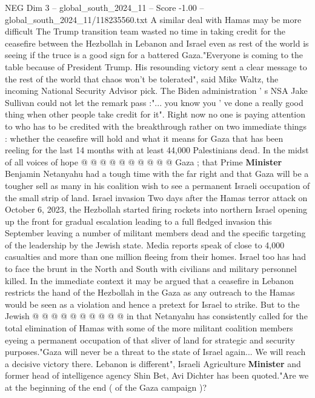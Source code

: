 \begin{textsample}{NEG Dim 3 – global\_south\_2024\_11 – Score -1.00 – global\_south\_2024\_11/118235560.txt}  \label{ex:f3_neg_136}
A similar deal with Hamas may be more difficult The Trump transition team wasted no time in taking credit for the ceasefire between the Hezbollah in Lebanon and Israel even as rest of the world is seeing if the truce is a good sign for a battered Gaza."Everyone is coming to the table because of President Trump.
His resounding victory sent a clear message to the rest of the world that chaos won't be tolerated", said Mike Waltz, the incoming National Security Advisor pick.
The Biden administration ' s NSA Jake Sullivan could not let the remark pass :"... you know you ' ve done a really good thing when other people take credit for it".
Right now no one is paying attention to who has to be credited with the breakthrough rather on two immediate things : whether the ceasefire will hold and what it means for Gaza that has been reeling for the last 14 months with at least 44,000 Palestinians dead.
In the midst of all voices of hope @ @ @ @ @ @ @ @ @ @ Gaza ; that Prime \textbf{Minister} Benjamin Netanyahu had a tough time with the far right and that Gaza will be a tougher sell as many in his coalition wish to see a permanent Israeli occupation of the small strip of land.
Israel invasion Two days after the Hamas terror attack on October 6, 2023, the Hezbollah started firing rockets into northern Israel opening up the front for gradual escalation leading to a full fledged invasion this September leaving a number of militant members dead and the specific targeting of the leadership by the Jewish state.
Media reports speak of close to 4,000 casualties and more than one million fleeing from their homes.
Israel too has had to face the brunt in the North and South with civilians and military personnel killed.
In the immediate context it may be argued that a ceasefire in Lebanon restricts the hand of the Hezbollah in the Gaza as any outreach to the Hamas would be seen as a violation and hence a pretext for Israel to strike.
But to the Jewish @ @ @ @ @ @ @ @ @ @ in that Netanyahu has consistently called for the total elimination of Hamas with some of the more militant coalition members eyeing a permanent occupation of that sliver of land for strategic and security purposes."Gaza will never be a threat to the state of Israel again...
We will reach a decisive victory there.
Lebanon is different", Israeli Agriculture \textbf{Minister} and former head of intelligence agency Shin Bet, Avi Dichter has been quoted."Are we at the beginning of the end ( of the Gaza campaign )?

\end{textsample}

